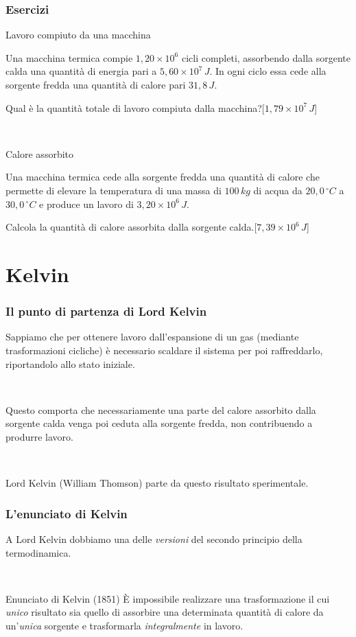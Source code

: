 \documentclass[]{beamer}
\theoremstyle{plain}
\begin{document}
\begin{frame}
\frametitle{Esercizi}
\begin{exampleblock}{Lavoro compiuto da una macchina}
  \small{
  Una macchina termica compie $ 1,20 \times 10^{6} $ cicli completi, assorbendo dalla sorgente calda una quantità di energia pari a $ 5,60 \times 10^{7} \, J $. In ogni ciclo essa cede alla sorgente fredda una quantità di calore pari $ 31,8 \, J $.

  Qual è la quantità totale di lavoro compiuta dalla macchina?\hspace*{\fill}[$ 1,79 \times 10^{7} \, J $]}
\end{exampleblock}

~

\begin{exampleblock}{Calore assorbito}
  \small{
  Una macchina termica cede alla sorgente fredda una quantità di calore che permette di elevare la temperatura di una massa di $ 100 \, kg $ di acqua da $ 20,0 \, ^\circ C $ a $ 30,0 \, ^\circ C $ e produce un lavoro di $ 3,20 \times 10^{6} \, J $.

  Calcola la quantità di calore assorbita dalla sorgente calda.\hspace*{\fill}[$ 7,39 \times 10^{6} \, J $]}
\end{exampleblock}
\end{frame}


\section{Kelvin}

\begin{frame}
  \frametitle{Il punto di partenza di Lord Kelvin}
  Sappiamo che per ottenere lavoro dall'espansione di un gas (mediante trasformazioni cicliche) è necessario scaldare il sistema per poi raffreddarlo, riportandolo allo stato iniziale.\pause

  ~
  
  Questo comporta che \alert{necessariamente una parte del calore assorbito dalla sorgente calda venga poi ceduta alla sorgente fredda, non contribuendo a produrre lavoro}.

  ~
  
  Lord Kelvin (William Thomson) parte da questo risultato sperimentale.
\end{frame}

\begin{frame}
\frametitle{L'enunciato di Kelvin}
A Lord Kelvin dobbiamo una delle \emph{versioni} del \alert{secondo principio della termodinamica}.

~

\begin{block}{Enunciato di Kelvin (1851)}
  È impossibile realizzare una trasformazione il cui \emph{unico} risultato sia quello di assorbire una determinata quantità di calore da un’\emph{unica} sorgente e trasformarla \emph{integralmente} in lavoro.
\end{block}
\end{frame}
\end{document}
